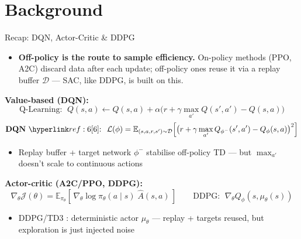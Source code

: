 \section{Background}
\begin{frame}{Recap: DQN, Actor-Critic \& DDPG}
\small
\begin{itemize}
    \item \textbf{Off-policy is the route to sample efficiency.} On-policy methods (PPO, A2C) discard data after each update; off-policy ones reuse it via a replay buffer $\mathcal{D}$ --- SAC, like DDPG, is built on this.
\end{itemize}
\vspace{-0.3em}
\textbf{Value-based (DQN):}
\[
\text{Q-Learning: }\; Q(s,a) \leftarrow Q(s,a) + \alpha\big( r + \gamma \max_{a'} Q(s',a') - Q(s,a) \big)
\]
\[
\textbf{DQN}~\rref{6}\text{: }\; \mathcal{L}(\phi) = \mathbb{E}_{(s,a,r,s') \sim \mathcal{D}}\!\left[ \big( r + \gamma \max_{a'} Q_{\phi^{-}}(s',a') - Q_\phi(s,a) \big)^{2} \right]
\]
\vspace{-0.7em}
\begin{itemize}
    \item Replay buffer + target network $\phi^-$ stabilise off-policy TD --- but $\max_{a'}$ doesn't scale to continuous actions
\end{itemize}
\vspace{-0.3em}
\textbf{Actor-critic (A2C/PPO, DDPG):}
\[
\nabla_\theta\mathcal{J}(\theta) = \mathbb{E}_{\pi_\theta}\!\left[\, \nabla_\theta\log\pi_\theta(a\mid s)\; \hat{A}(s,a) \,\right] \qquad
\text{DDPG: }\; \nabla_\theta Q_\phi(s,\mu_\theta(s))
\]
\begin{itemize}
    \item DDPG/TD3 : deterministic actor $\mu_\theta$ --- replay + targets reused, but exploration is just injected noise
\end{itemize}
\end{frame}

